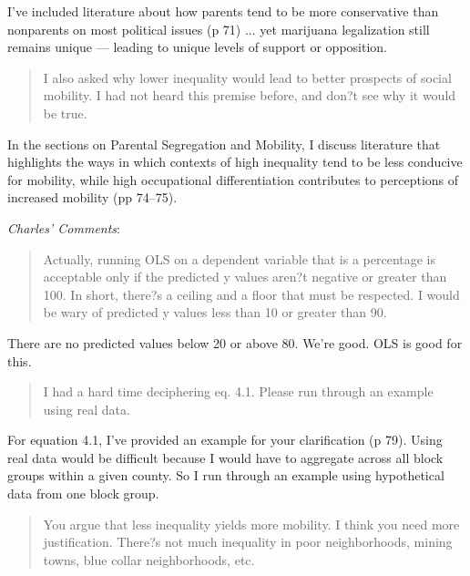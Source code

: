 \documentclass[12pt,stdletter,dateno,sigleft]{newlfm} %
\begin{document}
\begin{newlfm}
I've included literature about how parents tend to be more conservative than nonparents on most political issues (p 71) ... yet marijuana legalization still remains unique --- leading to unique levels of support or opposition. 

\begin{quotation}{\color{red}\noindent \footnotesize
I also asked why lower inequality would lead to better prospects of social mobility. I had not heard this premise before, and don?t see why it would be true.
}
\end{quotation}

In the sections on Parental Segregation and Mobility, I discuss literature that highlights the ways in which contexts of high inequality tend to be less conducive for mobility, while high occupational differentiation contributes to perceptions of increased mobility (pp 74--75). \newline


\textit{Charles' Comments}:

\begin{quotation}{\color{red}\noindent \footnotesize
Actually, running OLS on a dependent variable that is a percentage is acceptable only if the predicted y values aren?t negative or greater than 100. In short, there?s a ceiling and a floor that must be respected. I would be wary of predicted y values less than 10 or greater than 90.
}
\end{quotation}

There are no predicted values below 20 or above 80. We're good. OLS is good for this. 

\begin{quotation}{\color{red}\noindent \footnotesize
I had a hard time deciphering eq. 4.1. Please run through an example using real data.
}
\end{quotation}

For equation 4.1, I've provided an example for your clarification (p 79). Using real data would be difficult because I would have to aggregate across all block groups within a given county. So I run through an example using hypothetical data from one block group.

\begin{quotation}{\color{red}\noindent \footnotesize
You argue that less inequality yields more mobility. I think you need more justification. There?s not much inequality in poor neighborhoods, mining towns, blue collar neighborhoods, etc.
}
\end{quotation}



\end{newlfm}
\end{document}
